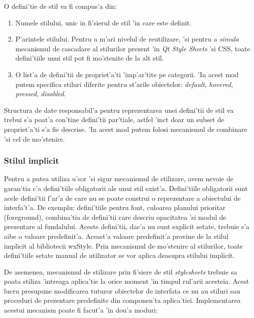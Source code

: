 \medskip

O defini'tie de stil va fi compus'a din:
\begin{enumerate}
\item Numele stilului, unic in fi'sierul de stil 'in care este definit.
\item P'arintele stilului. Pentru a m'ari nivelul de reutilizare, 'si pentru a \emph{simula} mecanismul de cascadare al stilurilor prezent 'in \emph{Qt Style Sheets} 'si CSS, toate defini'tiile unui stil pot fi mo'stenite de la alt stil.
\item O list'a de defini'tii de propriet'a'ti 'imp'ar'tite pe categorii. 'In acest mod putem specifica stiluri diferite pentru st'arile obiectelor: \emph{default}, \emph{hovered}, \emph{pressed}, \emph{disabled}.
\end{enumerate}

Structura de date responsabil'a pentru reprezentarea unei defini'tii de stil va trebui s'a poat'a con'tine defini'tii par'tiale, astfel 'inc{\ia}t doar un subset de propriet'a'ti s'a fie descrise. 'In acest mod putem folosi mecanismul de combinare 'si cel de mo'stenire.

\subsubsection{Stilul implicit}
Pentru a putea utiliza u'sor 'si sigur mecanismul de stilizare, avem nevoie de garan'tia c'a defini'tiile obligatorii ale unui stil exist'a. Defini'tiile obligatorii sunt acele defini'tii f'ar'a de care nu se poate construi o reprezentare a obiectului de interfa't'a. De exemplu: defini'tiile pentru font, culoarea planului prioritar (foreground), combina'tia de defini'tii care descriu opacitatea 'si modul de prezentare al fundalului. Aceste defini'tii, dac'a nu sunt explicit setate, trebuie s'a aibe o valoare predefinit'a. Aceast'a valoare predefinit'a provine de la stilul implicit al bibliotecii wxStyle. Prin mecanismul de mo'stenire al stilurilor, toate defini'tiile setate manual de utilizator se vor aplica deasupra stilului implicit. 

\medskip

De asemenea, mecanismul de stilizare prin fi'siere de stil \emph{stylesheets} trebuie sa poata stiliza 'intreaga aplica'tie la orice moment 'in timpul rul'arii acesteia. Acest lucru presupune modificarea tuturor obiectelor de interfata ce nu au stiluri sau proceduri de prezentare predefinite din componen'ta aplica'tiei. Implementarea acestui mecanism poate fi facut'a 'in dou'a moduri:

